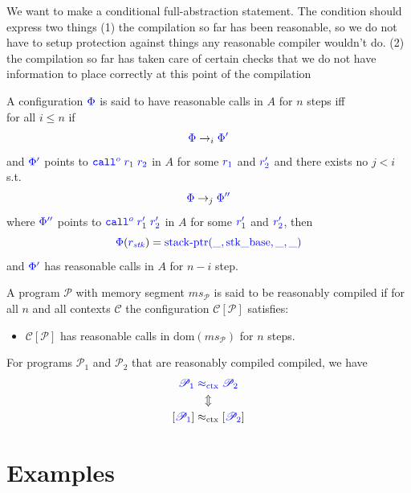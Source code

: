 \documentclass[a3paper]{article}
\newcommand{\dom}{\mathrm{dom}}
\newcommand{\sconeq}{\mathrel{\src{\approx_{\mathrm{ctx}}}}}
\newcommand{\tconeq}{\mathrel{\approx_{\mathrm{ctx}}}}
\newcommand{\sourcecolor}{\color{blue}}
\newcommand{\src}[1]{{\sourcecolor #1}}
\newcommand{\zinstr}[1]{\texttt{#1}}
\newcommand{\scall}[4][]{  
\ifthenelse{\equal{#3#4}{}}
  {\ensuremath{\zinstr{\src{call}}_{#1}^{#2}}}
  {\ensuremath{\zinstr{\src{call}}_{#1}^{#2} \; #3 \; #4}}
}
\newcommand{\stkptr}[1]{\mathrm{stack\text{-}ptr}(#1)}
\newcommand{\program}{\mathscr{P}}
\newcommand{\context}{\mathscr{C}}
\newcommand{\plug}[2]{#1[#2]}
\newcommand{\step}{\rightarrow}
\newcommand{\nstep}[1][n]{\step_{#1}}
\newcommand{\var}[1]{\mathit{#1}}
\newcommand{\ms}{\var{ms}}
\newcommand{\stk}{\var{stk}}
\newcommand{\constant}[1]{\mathrm{#1}}
\newcommand{\stkb}{\constant{stk\_base}}
\newcommand{\comp}[1]{[#1]}
\begin{document}
We want to make a conditional full-abstraction statement. The condition should express two things (1) the compilation so far has been reasonable, so we do not have to setup protection against things any reasonable compiler wouldn't do. (2) the compilation so far has taken care of certain checks that we do not have information to place correctly at this point of the compilation
\begin{definition}
  \label{def:check-stack-addr-before-call}
  A configuration $\src{\Phi}$ is said to have reasonable calls in $A$ for $n$ steps iff\\
  for all $i \leq n$ if
  \[
    \src{\Phi} \nstep[i] \src{\Phi'}
  \]
  and $\src{\Phi'}$ points to $\src{\scall{o}{r_1}{r_2}}$ in $A$ for some $\src{r_1}$ and $\src{r_2'}$ and there exists no $j<i$ s.t.
  \[
    \src{\Phi} \nstep[j] \src{\Phi''}
  \]
  where $\src{\Phi''}$ points to $\src{\scall{o}{r_1'}{r_2'}}$ in $A$ for some $\src{r_1'}$ and $\src{r_2'}$,
  then
  \[
    \src{\Phi}(\src{r_\stk}) = \src{\stkptr{\_,\stkb,\_,\_}}
  \]
  and $\src{\Phi'}$ has reasonable calls in $A$ for $n-i$ step.
\end{definition}

\begin{definition}
  A program $\program$ with memory segment $\ms_\program$ is said to be reasonably compiled if for all $n$ and all contexts $\context$ the configuration $\plug{\context}{\program}$ satisfies:
  \begin{itemize}
  \item $\plug{\context}{\program}$ has reasonable calls in $\dom(\ms_\program)$ for $n$ steps.
  \end{itemize}
\end{definition}

\begin{theorem}
  \label{thm:full-abstraction}
  For programs $\program_1$ and $\program_2$ that are reasonably compiled compiled, we have
  \begin{gather*}
    \src{\program_1} \sconeq \src{\program_2}\\
    \Updownarrow\\
    \comp{\src{\program_1}} \tconeq \comp{\src{\program_2}}
  \end{gather*}
\end{theorem}

\clearpage
\section{Examples}
\end{document}
